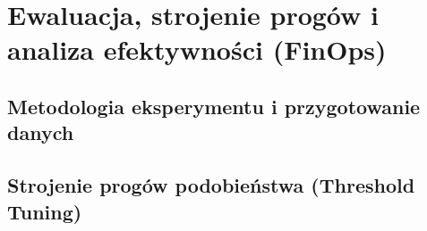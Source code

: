 \clearpage %
\section{Ewaluacja, strojenie progów i analiza efektywności (FinOps)}
\label{chap:ewaluacja-i-finops}


\subsection{Metodologia eksperymentu i przygotowanie danych}
\label{sec:metodologia-eksperymentu}


\subsection{Strojenie progów podobieństwa (Threshold Tuning)}
\label{sec:threshold-tuning}


